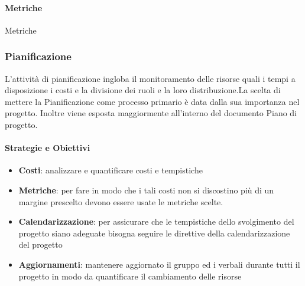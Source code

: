             
            \paragraph{Metriche}
            Metriche
            \def\productquality{
            {   Percentuale dei requisiti soddisfatti,
                $ \frac{ReqSoddisfatti}{ReqTotali}$, 
                $ 100 \% $,
                $ 100 \% $
            },
        }
 

            
            
          
        \newpage    
        \subsubsection{Pianificazione}
        L'attività di pianificazione ingloba il monitoramento delle risorse quali i tempi a disposizione i costi e la divisione dei ruoli e la loro distribuzione.La scelta di mettere la Pianificazione come processo primario è data dalla sua importanza nel progetto. Inoltre viene esposta maggiormente all'interno del documento Piano di progetto.
            \paragraph{Strategie e Obiettivi}
                \begin{itemize}
                    \item \textbf{Costi}: analizzare e quantificare costi e tempistiche
                    \item \textbf{Metriche}: per fare in modo che i  tali costi non si discostino più di un margine prescelto devono essere usate le metriche scelte.
                    \item \textbf{Calendarizzazione}: per assicurare che le tempistiche dello svolgimento del progetto siano adeguate bisogna seguire le direttive della calendarizzazione del progetto
                    \item \textbf{Aggiornamenti}: mantenere aggiornato il gruppo ed i verbali durante tutti il progetto in modo da quantificare il cambiamento delle risorse
                \end{itemize}
                
